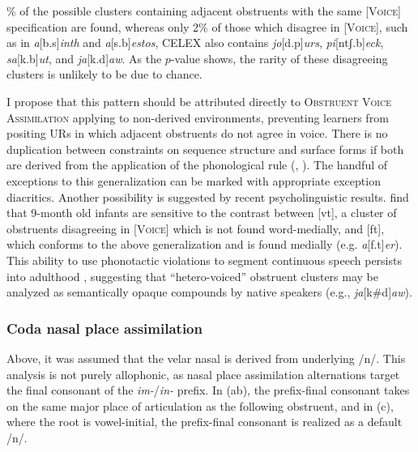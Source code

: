 \% of the possible clusters containing adjacent obstruents with the same [\textsc{Voice}] specification are found, whereas only 2\%  of those which disagree in [\textsc{Voice}], such as in \emph{a}[b.s]\emph{inth} and \emph{a}[s.b]\emph{estos}, CELEX also contains \emph{jo}[d.p]\emph{urs}, \emph{pi}[ntʃ.b]\emph{eck}, \emph{sa}[k.b]\emph{ut}, and \emph{ja}[k.d]\emph{aw}. As the $p$-value shows, the rarity of these disagreeing clusters is unlikely to be due to chance. 

I propose that this pattern should be attributed directly to \textsc{Obstruent Voice Assimilation} applying to non-derived environments, preventing learners from positing URs in which adjacent obstruents do not agree in voice. There is no duplication between constraints on sequence structure and surface forms if both are derived from the application of the phonological rule (\citealt[][401f.]{Stanley1967}, \citealt[][382]{SPE}). The handful of exceptions to this generalization can be marked with appropriate exception diacritics. Another possibility is suggested by recent psycholinguistic results. \citet{Mattys2001b} find that 9-month old infants are sensitive to the contrast between [vt], a cluster of obstruents disagreeing in [\textsc{Voice}] which is not found word-medially, and [ft], which conforms to the above generalization and is found medially (e.g. \emph{a}[f.t]\emph{er}). This ability to use phonotactic violations to segment continuous speech persists into adulthood \citep{McQueen1998}, suggesting that ``hetero-voiced'' obstruent clusters may be analyzed as semantically opaque compounds by native speakers (e.g., \emph{ja}[k\#d]\emph{aw}). 

\subsubsection{Coda nasal place assimilation}
\label{cnpasection}

Above, it was assumed that the velar nasal is derived from underlying /n/. 
This analysis is not purely allophonic, as nasal place assimilation alternations target the final consonant of the \emph{im-}/\emph{in-} prefix. In (\lastx ab), the prefix-final consonant takes on the same major place of articulation as the following obstruent, and in (\lastx c), where the root is vowel-initial, the prefix-final consonant is realized as a default /n/.

